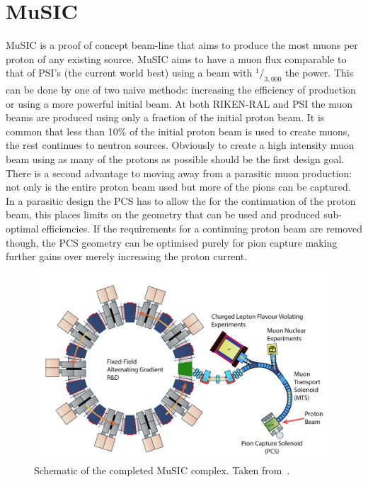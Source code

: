 \section{MuSIC} %
\label{cha:music}
MuSIC is a proof of concept beam-line that aims to produce the most muons per proton of any existing source. MuSIC aims to have a muon flux comparable to that of PSI's (the current world best) using a beam with \(^1/_{3,000}\) the power. This can be done by one of two naive methods: increasing the efficiency of production or using a more powerful initial beam. At both RIKEN-RAL and PSI the muon beams are produced using only a fraction of the initial proton beam. It is common that less than 10\% of the initial proton beam is used to create muons, the rest continues to neutron sources. Obviously to create a high intensity muon beam using as many of the protons as possible should be the first design goal. There is a second advantage to moving away from a parasitic muon production: not only is the entire proton beam used but more of the pions can be captured. In a parasitic design the PCS has to allow the for the continuation of the proton beam, this places limits on the geometry that can be used and produced sub-optimal efficiencies. If the requirements for a continuing proton beam are removed though, the PCS geometry can be optimised purely for pion capture making further gains over merely increasing the proton current.

\begin{figure}[htbp]
  \centering
    \includegraphics[width=.9\textwidth]{images/MuSIC_schematic_FFAG.png}
  \caption{Schematic of the completed MuSIC complex. Taken from~\cite{music_cdr}.}
  \label{fig:images_MuSIC_schematic_FFAG}
\end{figure}

